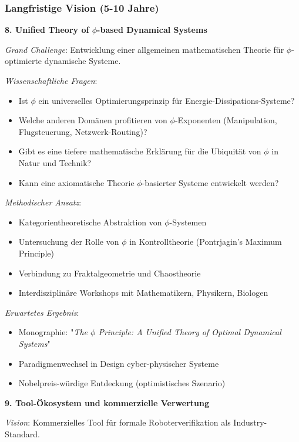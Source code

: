 ﻿\documentclass[a4paper,12pt]{article}
\theoremstyle{definition}
\begin{document}
\subsubsection{Langfristige Vision (5-10 Jahre)}

\textbf{8. Unified Theory of $\phi$-based Dynamical Systems}

\textit{Grand Challenge}: Entwicklung einer allgemeinen mathematischen Theorie für $\phi$-opti\-mierte dynamische Systeme.

\textit{Wissenschaftliche Fragen}:
\begin{itemize}
	\item Ist $\phi$ ein universelles Optimierungsprinzip für Energie-Dissipations-Systeme?
	\item Welche anderen Domänen profitieren von $\phi$-Exponenten (Manipulation, Flugsteuerung, Netzwerk-Routing)?
	\item Gibt es eine tiefere mathematische Erklärung für die Ubiquität von $\phi$ in Natur und Technik?
	\item Kann eine axiomatische Theorie $\phi$-basierter Systeme entwickelt werden?
\end{itemize}

\textit{Methodischer Ansatz}:
\begin{itemize}
	\item Kategorientheoretische Abstraktion von $\phi$-Systemen
	\item Untersuchung der Rolle von $\phi$ in Kontrolltheorie (Pontrjagin's Maximum Principle)
	\item Verbindung zu Fraktalgeometrie und Chaostheorie
	\item Interdisziplinäre Workshops mit Mathematikern, Physikern, Biologen
\end{itemize}

\textit{Erwartetes Ergebnis}:
\begin{itemize}
	\item Monographie: "\textit{The $\phi$ Principle: A Unified Theory of Optimal Dynamical Systems}"
	\item Paradigmenwechsel in Design cyber-physischer Systeme
	\item Nobelpreis-würdige Entdeckung (optimistisches Szenario)
\end{itemize}

\textbf{9. Tool-Ökosystem und kommerzielle Verwertung}

\textit{Vision}: Kommerzielles Tool für formale Roboterverifikation als Industry-Standard.
\end{document}
